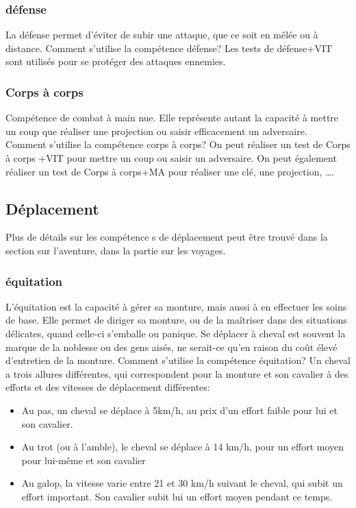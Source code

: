 \documentclass[10pt,a4paper,twocolumn]{book}
\begin{document}
\subsubsection{défense}
La défense permet d’éviter de subir une attaque, que ce soit en mêlée ou à distance.
Comment s’utilise la compétence défense?
Les tests de défense+VIT sont utilisés pour se protéger des attaques ennemies. 
\subsubsection{Corps à corps}
Compétence de combat à main nue. Elle représente autant la capacité à mettre un coup que réaliser une projection ou saisir efficacement un adversaire.
Comment s’utilise la compétence corps à corps?
On peut réaliser un test de Corps à corps +VIT pour mettre un coup ou saisir un adversaire. On peut également réaliser un test de Corps à corps+MA pour réaliser une clé, une projection, ….
\subsection{Déplacement}
Plus de détails sur les compétence s de déplacement peut être trouvé dans la section sur l’aventure, dans la partie sur les voyages.
\subsubsection{équitation}
L’équitation est la capacité à gérer sa monture, mais aussi à en effectuer les soins de base. Elle permet de diriger sa monture, ou de la maîtriser dans des situations délicates, quand celle-ci s’emballe ou panique. Se déplacer à cheval est souvent la marque de la noblesse ou des gens aisés, ne serait-ce qu’en raison du coût élevé d’entretien de la monture.
Comment s’utilise la compétence équitation?
Un cheval a trois allures différentes, qui correspondent pour la monture et son cavalier à des efforts et des vitesses de déplacement différentes:
\begin{itemize}
\item Au pas, un cheval se déplace à 5km/h, au prix d’un effort faible pour lui et son cavalier.
\item Au trot (ou à l’amble), le cheval se déplace à 14 km/h, pour un effort moyen pour lui-même et son cavalier
\item Au galop, la vitesse varie entre 21 et 30 km/h suivant le cheval, qui subit un effort important. Son cavalier subit lui un effort moyen pendant ce temps.
\end{itemize}
\end{document}
